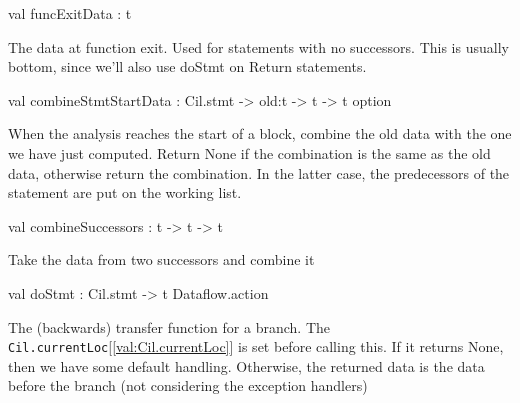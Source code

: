 \documentclass[11pt]{article}
\begin{document}
\begin{ocamldocsigend}
\begin{ocamldocdescription}
\end{ocamldocdescription}


\label{val:Dataflow.BackwardsTransfer.funcExitData}\begin{ocamldoccode}
val funcExitData : t
\end{ocamldoccode}
\begin{ocamldocdescription}
The data at function exit.  Used for statements with no successors.
      This is usually bottom, since we'll also use doStmt on Return 
      statements.


\end{ocamldocdescription}


\label{val:Dataflow.BackwardsTransfer.combineStmtStartData}\begin{ocamldoccode}
val combineStmtStartData : Cil.stmt ->
  old:t ->
  t -> t option
\end{ocamldoccode}
\begin{ocamldocdescription}
When the analysis reaches the start of a block, combine the old data 
 with the one we have just computed. Return None if the combination is 
 the same as the old data, otherwise return the combination. In the 
 latter case, the predecessors of the statement are put on the working 
 list.


\end{ocamldocdescription}


\label{val:Dataflow.BackwardsTransfer.combineSuccessors}\begin{ocamldoccode}
val combineSuccessors : t ->
  t -> t
\end{ocamldoccode}
\begin{ocamldocdescription}
Take the data from two successors and combine it


\end{ocamldocdescription}


\label{val:Dataflow.BackwardsTransfer.doStmt}\begin{ocamldoccode}
val doStmt : Cil.stmt -> t Dataflow.action
\end{ocamldoccode}
\begin{ocamldocdescription}
The (backwards) transfer function for a branch. The {\tt{Cil.currentLoc}}[\ref{val:Cil.currentLoc}] is 
 set before calling this. If it returns None, then we have some default 
 handling. Otherwise, the returned data is the data before the branch 
 (not considering the exception handlers)



\end{ocamldocdescription}
\end{ocamldocsigend}
\end{document}
